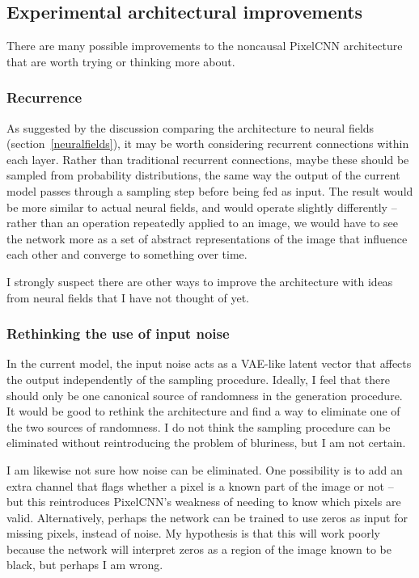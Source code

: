\documentclass[11pt, a4paper, openany]{book}
\begin{document}
\subsection{Experimental architectural improvements}

There are many possible improvements to the noncausal PixelCNN architecture that are worth trying or thinking more about.

\subsubsection{Recurrence}

As suggested by the discussion comparing the architecture to neural fields (section~\ref{neuralfields}), it may be worth considering recurrent connections within each layer. Rather than traditional recurrent connections, maybe these should be sampled from probability distributions, the same way the output of the current model passes through a sampling step before being fed as input. The result would be more similar to actual neural fields, and would operate slightly differently -- rather than an operation repeatedly applied to an image, we would have to see the network more as a set of abstract representations of the image that influence each other and converge to something over time.

I strongly suspect there are other ways to improve the architecture with ideas from neural fields that I have not thought of yet.

\subsubsection{Rethinking the use of input noise}

In the current model, the input noise acts as a VAE-like latent vector that affects the output independently of the sampling procedure. Ideally, I feel that there should only be one canonical source of randomness in the generation procedure. It would be good to rethink the architecture and find a way to eliminate one of the two sources of randomness. I do not think the sampling procedure can be eliminated without reintroducing the problem of bluriness, but I am not certain.

I am likewise not sure how noise can be eliminated. One possibility is to add an extra channel that flags whether a pixel is a known part of the image or not -- but this reintroduces PixelCNN's weakness of needing to know which pixels are valid. Alternatively, perhaps the network can be trained to use zeros as input for missing pixels, instead of noise. My hypothesis is that this will work poorly because the network will interpret zeros as a region of the image known to be black, but perhaps I am wrong.
\end{document}
